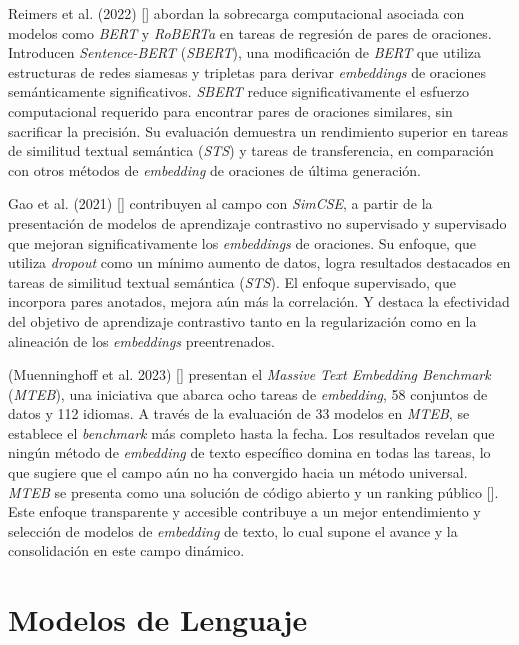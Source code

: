     Reimers et al. (2022) [\cite{reimers2019sentencebert}] abordan la sobrecarga computacional asociada con modelos como \emph{BERT} y \emph{RoBERTa} en tareas de regresión de pares de oraciones. Introducen \emph{Sentence-BERT} (\emph{SBERT}), una modificación de \emph{BERT} que utiliza estructuras de redes siamesas y tripletas para derivar \emph{embeddings} de oraciones semánticamente significativos. \emph{SBERT} reduce significativamente el esfuerzo computacional requerido para encontrar pares de oraciones similares, sin sacrificar la precisión. Su evaluación demuestra un rendimiento superior en tareas de similitud textual semántica (\emph{STS}) y tareas de transferencia, en comparación con otros métodos de \emph{embedding} de oraciones de última generación.

    Gao et al. (2021) [\cite{gao2022simcse}] contribuyen al campo con \emph{SimCSE}, a partir de la presentación de modelos de aprendizaje contrastivo no supervisado y supervisado que mejoran significativamente los \emph{embeddings} de oraciones. Su enfoque, que utiliza \emph{dropout} como un mínimo aumento de datos, logra resultados destacados en tareas de similitud textual semántica (\emph{STS}). El enfoque supervisado, que incorpora pares anotados, mejora aún más la correlación. Y destaca la efectividad del objetivo de aprendizaje contrastivo tanto en la regularización como en la alineación de los \emph{embeddings} preentrenados.

    (Muenninghoff et al. 2023) [\cite{muennighoff2023mteb}] presentan el \emph{Massive Text Embedding Benchmark} (\emph{MTEB}), una iniciativa que abarca ocho tareas de \emph{embedding}, 58 conjuntos de datos y 112 idiomas. A través de la evaluación de 33 modelos en \emph{MTEB}, se establece el \emph{benchmark} más completo hasta la fecha. Los resultados revelan que ningún método de \emph{embedding} de texto específico domina en todas las tareas, lo que sugiere que el campo aún no ha convergido hacia un método universal. \emph{MTEB} se presenta como una solución de código abierto y un ranking público  [\cite{leaderboard}]. Este enfoque transparente y accesible contribuye a un mejor entendimiento y selección de modelos de \emph{embedding} de texto, lo cual supone el avance y la consolidación en este campo dinámico.

\section{Modelos de Lenguaje}
   
